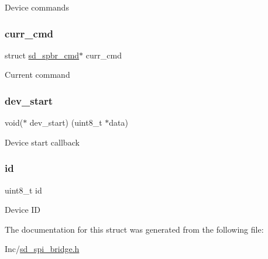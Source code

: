 Device commands \mbox{\label{structsd__spbr__dev_a3217f31b08eb084b2c943abd2af5ca8b}} 
\subsubsection{\texorpdfstring{curr\+\_\+cmd}{curr\_cmd}}
{\footnotesize\ttfamily struct \mbox{\hyperlink{structsd__spbr__cmd}{sd\+\_\+spbr\+\_\+cmd}}$\ast$ curr\+\_\+cmd}

Current command \mbox{\label{structsd__spbr__dev_a3e035473248af7cdffca805f540617c8}} 
\subsubsection{\texorpdfstring{dev\+\_\+start}{dev\_start}}
{\footnotesize\ttfamily void($\ast$ dev\+\_\+start) (uint8\+\_\+t $\ast$data)}

Device start callback \mbox{\label{structsd__spbr__dev_a1e6927fa1486224044e568f9c370519b}} 
\subsubsection{\texorpdfstring{id}{id}}
{\footnotesize\ttfamily uint8\+\_\+t id}

Device ID 

The documentation for this struct was generated from the following file\+:\begin{DoxyCompactItemize}
\item 
Inc/\mbox{\hyperlink{sd__spi__bridge_8h}{sd\+\_\+spi\+\_\+bridge.\+h}}\end{DoxyCompactItemize}
